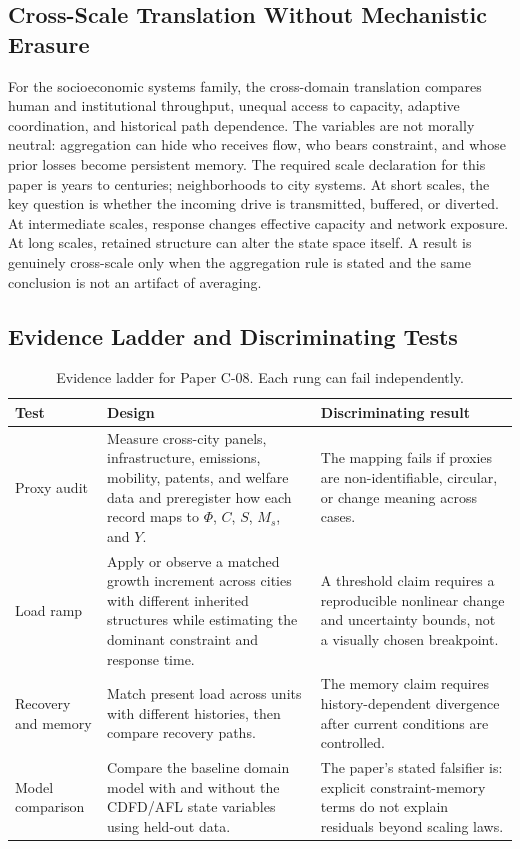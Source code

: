 \documentclass[11pt,a4paper]{article}
\begin{document}
\subsection{Cross-Scale Translation Without Mechanistic Erasure}

For the socioeconomic systems family, the cross-domain translation compares human and institutional throughput, unequal access to capacity, adaptive coordination, and historical path dependence. The variables are not morally neutral: aggregation can hide who receives flow, who bears constraint, and whose prior losses become persistent memory. \cite{BarabasiAlbert1999,WattsStrogatz1998,Holling1973,Shannon1948}
The required scale declaration for this paper is years to centuries; neighborhoods to city systems. At short
scales, the key question is whether the incoming drive is transmitted,
buffered, or diverted. At intermediate scales, response changes effective
capacity and network exposure. At long scales, retained structure can alter the
state space itself. A result is genuinely cross-scale only when the aggregation
rule is stated and the same conclusion is not an artifact of averaging.

\subsection{Evidence Ladder and Discriminating Tests}

\begin{table}[htbp]
\centering
\small
\caption{Evidence ladder for Paper C-08. Each rung can fail independently.}
\begin{tabularx}{\textwidth}{|p{}|X|X|}
\hline
\textbf{Test} & \textbf{Design} & \textbf{Discriminating result} \\
\hline
Proxy audit & Measure cross-city panels, infrastructure, emissions, mobility, patents, and welfare data and preregister how each record maps to $\Phi$, $C$, $S$, $M_s$, and $Y$. & The mapping fails if proxies are non-identifiable, circular, or change meaning across cases. \\
\hline
Load ramp & Apply or observe a matched growth increment across cities with different inherited structures while estimating the dominant constraint and response time. & A threshold claim requires a reproducible nonlinear change and uncertainty bounds, not a visually chosen breakpoint. \\
\hline
Recovery and memory & Match present load across units with different histories, then compare recovery paths. & The memory claim requires history-dependent divergence after current conditions are controlled. \\
\hline
Model comparison & Compare the baseline domain model with and without the CDFD/AFL state variables using held-out data. & The paper's stated falsifier is: explicit constraint-memory terms do not explain residuals beyond scaling laws. \\
\hline
\end{tabularx}
\end{table}
\end{document}
